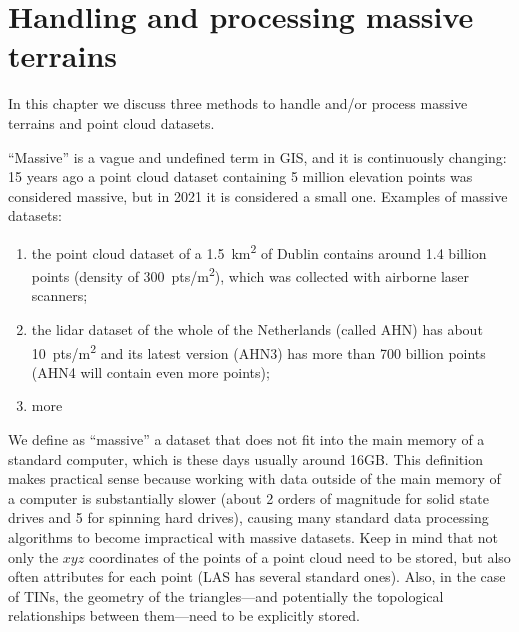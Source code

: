 
\setchapterpreamble[u]{\margintoc}

\chapter{Handling and processing massive terrains}%
\label{chap:massive}


\graphicspath{{massive/}}


In this chapter we discuss three methods to handle and/or process {\LARGE massive} terrains and point cloud datasets.

%

``Massive'' is a vague and undefined term in GIS, and it is continuously changing: 15 years ago a point cloud dataset containing 5 million elevation points was considered massive, but in 2021 it is considered a small one.%
Examples of massive datasets: 
\begin{enumerate}
  \item the point cloud dataset of a \SI{1.5}{km^2} of Dublin contains around 1.4 billion points (density of \SI{300}{pts/m^2}), which was collected with airborne laser scanners; 
  \item the lidar dataset of the whole of the Netherlands (called AHN) has about \SI{10}{pts/m^2} and its latest version (AHN3) has more than 700 billion points (AHN4 will contain even more points);
  \item more %
\end{enumerate}

%

We define as ``massive'' a dataset that does not fit into the main memory of a standard computer, which is these days usually around 16GB\@.
This definition makes practical sense because working with data outside of the main memory of a computer is substantially slower (about 2 orders of magnitude for solid state drives and 5 for spinning hard drives), causing many standard data processing algorithms to become impractical with massive datasets.
Keep in mind that not only the $xyz$ coordinates of the points of a point cloud need to be stored, but also often attributes for each point (LAS has several standard ones).
Also, in the case of TINs, the geometry of the triangles---and potentially the topological relationships between them---need to be explicitly stored.

